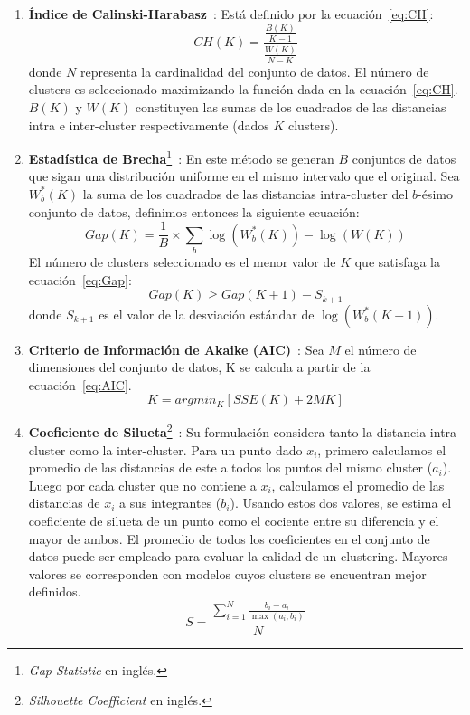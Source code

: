 \begin{enumerate}
    \item \textbf{Índice de Calinski-Harabasz}~\cite{Calinski74}: Está definido por la ecuación~\ref{eq:CH}:
    \begin{equation}
        \label{eq:CH}
        CH(K)=\frac{\frac{B(K)}{K-1}}{\frac{W(K)}{N-K}}
    \end{equation}
    donde $N$ representa la cardinalidad del conjunto de datos.
    El número de clusters es seleccionado maximizando la función dada en la ecuación~\ref{eq:CH}.
    $B(K)$ y $W(K)$ constituyen las sumas de los cuadrados de las distancias intra e inter-cluster respectivamente (dados $K$ clusters).

    \item \textbf{Estadística de Brecha}\footnote{\textit{Gap Statistic} en inglés.}~\cite{Tibshirani01}: En este método se generan $B$ conjuntos de datos que sigan una distribución uniforme en el mismo intervalo que el original.
    Sea $W_{b}^{*}(K)$ la suma de los cuadrados de las distancias intra-cluster del $b$-ésimo conjunto de datos, definimos entonces la siguiente ecuación:
    \begin{equation}
        Gap(K) = \frac{1}{B} \times\sum_{b}{\log(W_{b}^{*}(K)) - \log(W(K))}
    \end{equation}
    El número de clusters seleccionado es el menor valor de $K$ que satisfaga la ecuación~\ref{eq:Gap}:
    \begin{equation}
        \label{eq:Gap}
        Gap(K) \geq Gap(K+1) - S_{k+1}
    \end{equation}
    donde $S_{k+1}$ es el valor de la desviación estándar de $\log(W_{b}^{*}(K+1))$.

    \item \textbf{Criterio de Información de Akaike (AIC)}~\cite{Yeung01}: Sea $M$ el número de dimensiones del conjunto de datos, K se calcula a partir de la ecuación~\ref{eq:AIC}.
    \begin{equation}
        \label{eq:AIC}
        K=argmin_{K}[SSE(K)+2M K]
    \end{equation}

    \item \textbf{Coeficiente de Silueta}\footnote{\textit{Silhouette Coefficient} en inglés.}~\cite{Kaufman90}: Su formulación considera tanto la distancia intra-cluster como la inter-cluster.
    Para un punto dado $x_i$, primero calculamos el promedio de las distancias de este a todos los puntos del mismo cluster ($a_i$).
    Luego por cada cluster que no contiene a $x_i$, calculamos el promedio de las distancias de $x_i$ a sus integrantes ($b_i$).
    Usando estos dos valores, se estima el coeficiente de silueta de un punto como el cociente entre su diferencia y el mayor de ambos.
    El promedio de todos los coeficientes en el conjunto de datos puede ser empleado para evaluar la calidad de un clustering.
    Mayores valores se corresponden con modelos cuyos clusters se encuentran mejor definidos.
    \begin{equation}
        S = \frac{\sum_{i=1}^{N}{\frac{b_{i}-a_{i}}{\max(a_i,b_i)}}}{N}
    \end{equation}
\end{enumerate}

